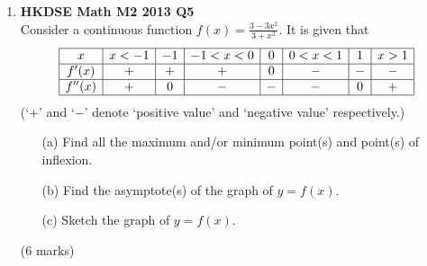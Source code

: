 \documentclass{report}
\begin{document}
\begin{enumerate}
	\item \textbf{HKDSE Math M2 2013 Q5}\\
	Consider a continuous function $f(x) = \displaystyle\frac{3 -3x^2}{3+x^2}$. It is given that $$\begin{array}{|c|c|c|c|c|c|c|c|}
		\hline
		x & x<-1 & -1 & -1<x<0 & 0 & 0<x<1 & 1 & x>1\\
		\hline
		f'(x) & + & + & + & 0 & - & - & -\\
		\hline		
		f''(x) & + & 0 & - & - & - & 0 & +\\
		\hline
    \end{array}$$
	(`$+$' and `$-$' denote `positive value' and `negative value' respectively.)
	\begin{enumerate}
		\item [(a)]Find all the maximum and/or minimum point(s) and point(s) of inflexion.
		\item [(b)]Find the asymptote(s) of the graph of $y = f(x)$. 
		\item [(c)]Sketch the graph of $y = f(x)$.
	\end{enumerate}
	(6 marks)

	\newpage


\end{enumerate}
\end{document}
